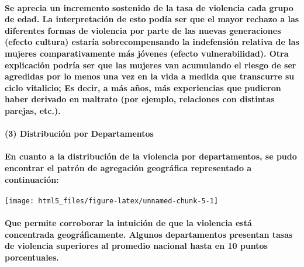 \documentclass[]{article}
\let\oldparagraph\paragraph
\renewcommand{\paragraph}[1]{\oldparagraph{#1}\mbox{}}
\begin{document}
\paragraph{Se aprecia un incremento sostenido de la tasa de violencia
cada grupo de edad. La interpretación de esto podía ser que el mayor
rechazo a las diferentes formas de violencia por parte de las nuevas
generaciones (efecto cultura) estaría sobrecompensando la indefensión
relativa de las mujeres comparativamente más jóvenes (efecto
vulnerabilidad). Otra explicación podría ser que las mujeres van
acumulando el riesgo de ser agredidas por lo menos una vez en la vida a
medida que transcurre su ciclo vitalicio; Es decir, a más años, más
experiencias que pudieron haber derivado en maltrato (por ejemplo,
relaciones con distintas parejas,
etc.).}\label{se-aprecia-un-incremento-sostenido-de-la-tasa-de-violencia-cada-grupo-de-edad.-la-interpretacion-de-esto-podia-ser-que-el-mayor-rechazo-a-las-diferentes-formas-de-violencia-por-parte-de-las-nuevas-generaciones-efecto-cultura-estaria-sobrecompensando-la-indefension-relativa-de-las-mujeres-comparativamente-mas-jovenes-efecto-vulnerabilidad.-otra-explicacion-podria-ser-que-las-mujeres-van-acumulando-el-riesgo-de-ser-agredidas-por-lo-menos-una-vez-en-la-vida-a-medida-que-transcurre-su-ciclo-vitalicio-es-decir-a-mas-anos-mas-experiencias-que-pudieron-haber-derivado-en-maltrato-por-ejemplo-relaciones-con-distintas-parejas-etc..}

\paragraph{(3) Distribución por
Departamentos}\label{distribucion-por-departamentos}

\paragraph{En cuanto a la distribución de la violencia por
departamentos, se pudo encontrar el patrón de agregación geográfica
representado a
continuación:}\label{en-cuanto-a-la-distribucion-de-la-violencia-por-departamentos-se-pudo-encontrar-el-patron-de-agregacion-geografica-representado-a-continuacion}

\begin{center}\texttt{[image: html5\_files/figure-latex/unnamed-chunk-5-1]} \end{center}

\paragraph{Que permite corroborar la intuición de que la violencia está
concentrada geográficamente. Algunos departamentos presentan tasas de
violencia superiores al promedio nacional hasta en 10 puntos
porcentuales.}\label{que-permite-corroborar-la-intuicion-de-que-la-violencia-esta-concentrada-geograficamente.-algunos-departamentos-presentan-tasas-de-violencia-superiores-al-promedio-nacional-hasta-en-10-puntos-porcentuales.}
\end{document}
